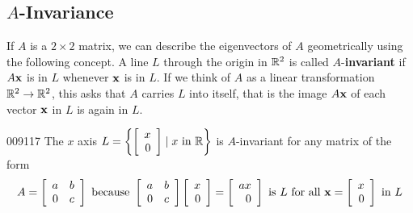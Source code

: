 \subsection*{$A$-Invariance}


If $A$ is a $2 \times 2$ matrix, we can describe the eigenvectors of $A$ geometrically using the following concept. A line $L$ through the origin in $\mathbb{R}^2$ is called $A$-\textbf{invariant} if $A\textbf{x}$ is in $L$ whenever $\textbf{x}$ is in $L$. If we think of $A$ as a linear transformation $\mathbb{R}^2 \to \mathbb{R}^2$, this asks that $A$ carries $L$ into itself, that is the image $A\textbf{x}$ of each vector $\textbf{x}$ in $L$ is again in $L$.


\begin{example}{}{009117}
The $x$ axis $L = \left\{ \left[ \begin{array}{r}
x \\
0
\end{array} \right] \mid x \mbox{ in } \mathbb{R} \right\}$  is $A$-invariant for any matrix of the form
\begin{equation*}
A = \left[ \begin{array}{rr}
a & b \\
0 & c 
\end{array} \right] \mbox{ because }  \left[ \begin{array}{rr}
a & b \\
0 & c 
\end{array} \right] \left[ \begin{array}{r}
x \\
0
\end{array}\right] = \left[ \begin{array}{r}
ax \\
0
\end{array}\right] \mbox{ is } L \mbox{ for all } \textbf{x} = \left[ \begin{array}{r}
x \\
0
\end{array}\right] \mbox{ in } L
\end{equation*}
\end{example}

\begin{wrapfigure}[12]{l}{5cm} 
	\centering
	
\end{wrapfigure}

